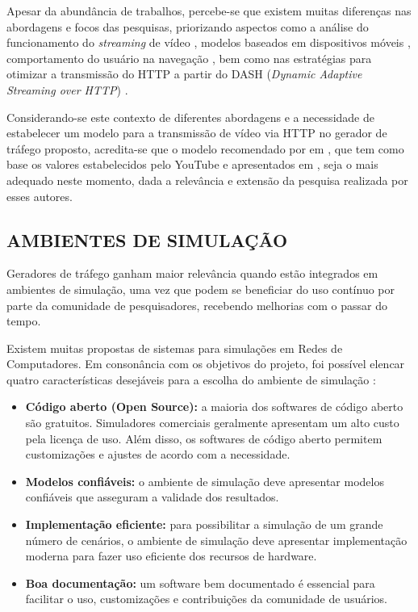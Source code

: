 Apesar da abundância de trabalhos, percebe-se que existem muitas diferenças nas abordagens e focos das pesquisas, priorizando aspectos como a análise do funcionamento do \textit{streaming} de vídeo \cite{Ramos-munoz2014} \cite{Ragimova2019}, modelos baseados em dispositivos móveis \cite{Fang2016}, comportamento do usuário na navegação \cite{Tsompanidis2014} \cite{Zhao2013}, bem como nas estratégias para otimizar a transmissão do HTTP a partir do DASH (\textit{Dynamic Adaptive Streaming over HTTP}) \cite{Waldmann2017}. 

Considerando-se este contexto de diferentes abordagens e a necessidade de estabelecer um modelo para a transmissão de vídeo via HTTP no gerador de tráfego proposto, acredita-se que o modelo recomendado por  em \cite{Navarro-Ortiz2020}, que tem como base os valores estabelecidos pelo YouTube e apresentados em \cite{youtube-recommendations}, seja o mais adequado neste momento, dada a relevância e extensão da pesquisa realizada por esses autores.


\subsection{AMBIENTES DE SIMULAÇÃO}

Geradores de tráfego ganham maior relevância quando estão integrados em ambientes de simulação, uma vez que podem se beneficiar do uso contínuo por parte da comunidade de pesquisadores, recebendo melhorias com o passar do tempo.

Existem muitas propostas de sistemas para simulações em Redes de Computadores. Em consonância com os objetivos do projeto, foi possível elencar quatro características desejáveis para a escolha do ambiente de simulação \cite{SaulodaMata2017}: 
\begin{itemize}
	\item \textbf{Código aberto (Open Source):} a maioria dos softwares de código aberto são gratuitos. Simuladores comerciais geralmente apresentam um alto custo pela licença de uso. Além disso, os softwares de código aberto permitem customizações e ajustes de acordo com a necessidade.
	\item \textbf{Modelos confiáveis:} o ambiente de simulação deve apresentar modelos confiáveis que asseguram a validade dos resultados.
	\item \textbf{Implementação eficiente:} para possibilitar a simulação de um grande número de cenários, o ambiente de simulação deve apresentar implementação moderna para fazer uso eficiente dos recursos de hardware.
	\item \textbf{Boa documentação:} um software bem documentado é essencial para facilitar o uso, customizações e contribuições da comunidade de usuários.
\end{itemize}

